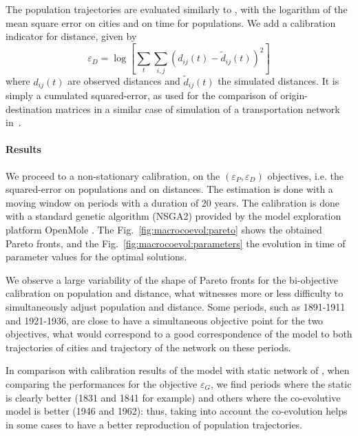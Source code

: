\documentclass[11pt]{article}
\begin{document}
The population trajectories are evaluated similarly to \cite{raimbault2018indirect}, with the logarithm of the mean square error on cities and on time for populations. We add a calibration indicator for distance, given by
\[
\varepsilon_D = \log \left[ \sum_t \sum_{i,j} \left(d_{ij}(t) - \tilde{d}_{ij}(t)\right)^2\right]
\]
where $d_{ij}(t)$ are observed distances and $\tilde{d}_{ij}(t)$ the simulated distances. It is simply a cumulated squared-error, as used for the comparison of origin-destination matrices in a similar case of simulation of a transportation network in~\cite{jacobs2016transport}.



\paragraph{Results}

We proceed to a non-stationary calibration, on the $(\varepsilon_P,\varepsilon_D)$ objectives, i.e. the squared-error on populations and on distances. The estimation is done with a moving window on periods with a duration of 20 years. The calibration is done with a standard genetic algorithm (NSGA2) provided by the model exploration platform OpenMole \citep{reuillon2013openmole}. The Fig.~\ref{fig:macrocoevol:pareto} shows the obtained Pareto fronts, and the Fig.~\ref{fig:macrocoevol:parameters} the evolution in time of parameter values for the optimal solutions.

We observe a large variability of the shape of Pareto fronts for the bi-objective calibration on population and distance, what witnesses more or less difficulty to simultaneously adjust population and distance. Some periods, such as 1891-1911 and 1921-1936, are close to have a simultaneous objective point for the two objectives, what would correspond to a good correspondence of the model to both trajectories of cities and trajectory of the network on these periods. 

In comparison with calibration results of the model with static network of \cite{raimbault2018indirect}, when comparing the performances for the objective $\varepsilon_G$, we find periods where the static is clearly better (1831 and 1841 for example) and others where the co-evolutive model is better (1946 and 1962): thus, taking into account the co-evolution helps in some cases to have a better reproduction of population trajectories.
\end{document}
